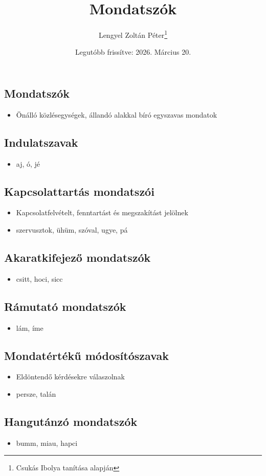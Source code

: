 \documentclass{article}
\title{Mondatszók}
\author{Lengyel Zoltán Péter\thanks{Csukás Ibolya tanítása alapján}}
\date{Legutóbb frissítve: 2026. Március 20.}
\begin{document}
\maketitle
\tableofcontents
\newpage

\begin{center}
    \section{Mondatszók}
\end{center}

\begin{itemize}
    \item Önálló közlésegységek, állandó alakkal bíró egyszavas mondatok
\end{itemize}

\subsection{Indulatszavak}
\begin{itemize}
    \item aj, ó, jé
\end{itemize}

\subsection{Kapcsolattartás mondatszói}
\begin{itemize}
    \item Kapcsolatfelvételt, fenntartást és megszakítást jelölnek
    \item szervusztok, ühüm, szóval, ugye, pá
\end{itemize}

\subsection{Akaratkifejező mondatszók}
\begin{itemize}
    \item csitt, hoci, sicc
\end{itemize}

\subsection{Rámutató mondatszók}
\begin{itemize}
    \item lám, íme
\end{itemize}

\subsection{Mondatértékű módosítószavak}
\begin{itemize}
    \item Eldöntendő kérdésekre válaszolnak
    \item persze, talán
\end{itemize}

\subsection{Hangutánzó mondatszók} 
\begin{itemize}
    \item bumm, miau, hapci
\end{itemize}
\end{document}
